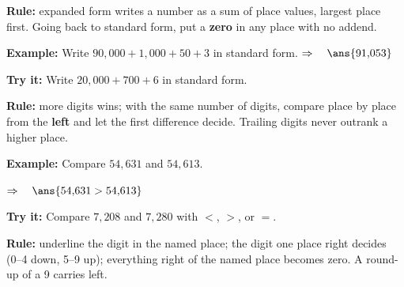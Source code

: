 \documentclass[12pt]{article}
\begin{document}


\begin{formulabox}
\textbf{Rule:} expanded form writes a number as a sum of place values, largest
place first. Going back to standard form, put a \textbf{zero} in any place with
no addend.
\end{formulabox}

\begin{examplebox}
\textbf{Example:} \quad Write $90{,}000 + 1{,}000 + 50 + 3$ in standard form.
$\Rightarrow\quad \ans{91{,}053}$
\end{examplebox}

\begin{tryitbox}
\textbf{Try it:} \quad Write $20{,}000 + 700 + 6$ in standard form.\\[2pt]
\end{tryitbox}


\begin{formulabox}
\textbf{Rule:} more digits wins; with the same number of digits, compare place
by place from the \textbf{left} and let the first difference decide. Trailing
digits never outrank a higher place.
\end{formulabox}

\begin{examplebox}
\textbf{Example:} \quad Compare $54{,}631$ and $54{,}613$.

$\Rightarrow\quad \ans{54{,}631 > 54{,}613}$
\end{examplebox}

\begin{tryitbox}
\textbf{Try it:} \quad Compare $7{,}208$ and $7{,}280$ with $<$, $>$, or
$=$.\\[2pt]
\end{tryitbox}


\begin{formulabox}
\textbf{Rule:} underline the digit in the named place; the digit one place
right decides (0--4 down, 5--9 up); everything right of the named place becomes
zero. A round-up of a 9 carries left.
\end{formulabox}
\end{document}
